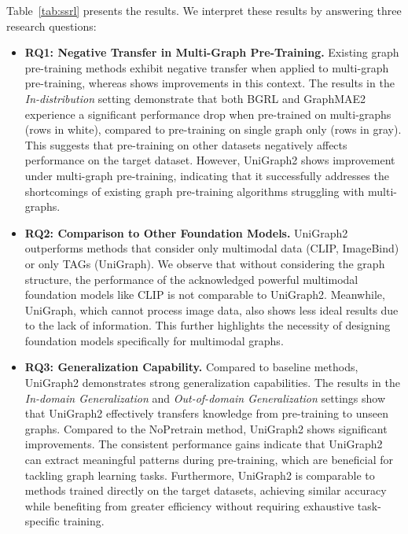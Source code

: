Table~\ref{tab:ssrl} presents the results.
We interpret these results by answering three research questions:
\begin{itemize}[leftmargin=*,itemsep=0pt,parsep=0.2em,topsep=0.3em,partopsep=0.3em]
    \item \textbf{RQ1: Negative Transfer in Multi-Graph Pre-Training.} Existing graph pre-training methods exhibit negative transfer when applied to multi-graph pre-training, whereas \model shows improvements in this context. The results in the \textit{In-distribution} setting demonstrate that both BGRL and GraphMAE2 experience a significant performance drop when pre-trained on multi-graphs (rows in white), compared to pre-training on single graph only (rows in gray). This suggests that pre-training on other datasets negatively affects performance on the target dataset. However, UniGraph2 shows improvement under multi-graph pre-training, indicating that it successfully addresses the shortcomings of existing graph pre-training algorithms struggling with multi-graphs.
    \item \textbf{RQ2: Comparison to Other Foundation Models.} UniGraph2 outperforms methods that consider only multimodal data (CLIP, ImageBind) or only TAGs (UniGraph). We observe that without considering the graph structure, the performance of the acknowledged powerful multimodal foundation models like CLIP is not comparable to UniGraph2. Meanwhile, UniGraph, which cannot process image data, also shows less ideal results due to the lack of information. This further highlights the necessity of designing foundation models specifically for multimodal graphs.
    \item \textbf{RQ3: Generalization Capability.} Compared to baseline methods, UniGraph2 demonstrates strong generalization capabilities. The results in the \textit{In-domain Generalization} and \textit{Out-of-domain Generalization} settings show that UniGraph2 effectively transfers knowledge from pre-training to unseen graphs. Compared to the NoPretrain method, UniGraph2 shows significant improvements. The consistent performance gains indicate that UniGraph2 can extract meaningful patterns during pre-training, which are beneficial for tackling graph learning tasks. Furthermore, UniGraph2 is comparable to methods trained directly on the target datasets, achieving similar accuracy while benefiting from greater efficiency without requiring exhaustive task-specific training.
\end{itemize}










